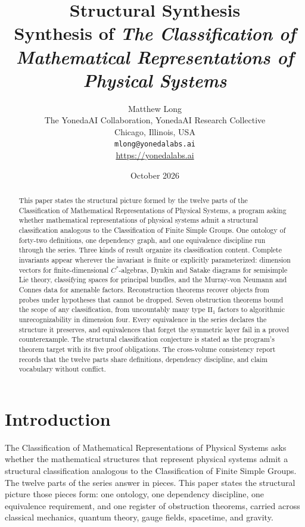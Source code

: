 \documentclass[11pt,letterpaper]{article}
\title{Structural Synthesis\\[4pt]
  {\normalsize Synthesis of \emph{The Classification of Mathematical Representations of Physical Systems}}}
\author{Matthew Long\\
  \small The YonedaAI Collaboration, YonedaAI Research Collective\\
  \small Chicago, Illinois, USA\\
  \small \texttt{mlong@yonedalabs.ai}\\
  \small \url{https://yonedalabs.ai}}
\date{October 2026}
\theoremstyle{definition}
\theoremstyle{remark}
\begin{document}
\maketitle

\begin{abstract}
This paper states the structural picture formed by the twelve parts of the Classification of Mathematical Representations of Physical Systems, a program asking whether mathematical representations of physical systems admit a structural classification analogous to the Classification of Finite Simple Groups. One ontology of forty-two definitions, one dependency graph, and one equivalence discipline run through the series. Three kinds of result organize its classification content. Complete invariants appear wherever the invariant is finite or explicitly parameterized: dimension vectors for finite-dimensional $C^*$-algebras, Dynkin and Satake diagrams for semisimple Lie theory, classifying spaces for principal bundles, and the Murray-von Neumann and Connes data for amenable factors. Reconstruction theorems recover objects from probes under hypotheses that cannot be dropped. Seven obstruction theorems bound the scope of any classification, from uncountably many type $\mathrm{II}_1$ factors to algorithmic unrecognizability in dimension four. Every equivalence in the series declares the structure it preserves, and equivalences that forget the symmetric layer fail in a proved counterexample. The structural classification conjecture is stated as the program's theorem target with its five proof obligations. The cross-volume consistency report records that the twelve parts share definitions, dependency discipline, and claim vocabulary without conflict.
\end{abstract}

\section{Introduction}

The Classification of Mathematical Representations of Physical Systems asks whether the mathematical structures that represent physical systems admit a structural classification analogous to the Classification of Finite Simple Groups. The twelve parts of the series answer in pieces. This paper states the structural picture those pieces form: one ontology, one dependency discipline, one equivalence requirement, and one register of obstruction theorems, carried across classical mechanics, quantum theory, gauge fields, spacetime, and gravity.
\end{document}
